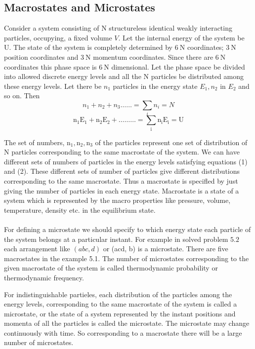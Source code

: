 \subsection{Macrostates and Microstates}
\par Consider a system consisting of $\mathrm{N}$ structureless identical weakly interacting particles, occupying, a fixed volume $V$. Let the internal energy of the system be U. The state of the system is completely determined by $6 \mathrm{~N}$ coordinates; $3 \mathrm{~N}$ position coordinates and $3 \mathrm{~N}$ momentum coordinates. Since there are $6 \mathrm{~N}$ coordinates this phase space is $6 \mathrm{~N}$ dimensional. Let the phase space be divided into allowed discrete energy levels and all the $\mathrm{N}$ particles be distributed among these energy levels. Let there be $n_{1}$ particles in the energy state $E_{1}, n_{2}$ in $E_{2}$ and so on. Then
$$n_{1}+n_{2}+n_{3} \ldots \ldots=\sum_{i} n_{i}=N$$
$$\mathrm{n}_{1} \mathrm{E}_{1}+\mathrm{n}_{2} \mathrm{E}_{2}+\ldots \ldots \ldots=\sum_{\mathrm{i}} \mathrm{n}_{\mathrm{i}} \mathrm{E}_{\mathrm{i}}=\mathrm{U}$$
\par The set of numbers, $\mathrm{n}_{1}, \mathrm{n}_{2}, \mathrm{n}_{3}$ of the particles represent one set of distribution of $\mathrm{N}$ particles corresponding to the same macrostate of the system. We can have different sets of numbers of particles in the energy levels satisfying equations (1) and (2). These different sets of number of particles give different distributions corresponding to the same macrostate. Thus a macrostate is specifled by just giving the number of particles in each energy state. Macrostate is a state of a system which is represented by the macro properties like pressure, volume, temperature, density etc. in the equilibrium state.\\\\
For defining a microstate we should specify to which energy state each particle of the system belongs at a particular instant. For example in solved problem $5.2$ each arrangement like $(a b c, d)$ or (acd, b) is a microstate. There are five macrostates in the example 5.1. The number of microstates corresponding to the given macrostate of the system is called thermodynamic probability or thermodynamic frequency.
\par For indistinguishable partieles, each distribution of the particles among the energy levels, corresponding to the same macrostate of the system is called a microstate, or the state of a system represented by the instant positions and momenta of all the particles is called the microstate. The microstate may change continuously with time. So corresponding to a macrostate there will be a large number of microstates.

